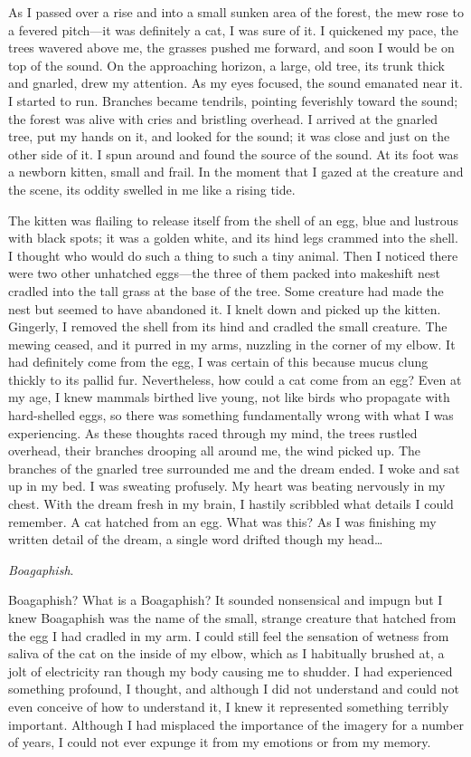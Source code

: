 As I passed over a rise and into a small sunken area of the forest, the
mew rose to a fevered pitch---it was definitely a cat, I was sure of it.
I quickened my pace, the trees wavered above me, the grasses pushed me
forward, and soon I would be on top of the sound. On the approaching
horizon, a large, old tree, its trunk thick and gnarled, drew my
attention. As my eyes focused, the sound emanated near it. I started to
run. Branches became tendrils, pointing feverishly toward the sound; the
forest was alive with cries and bristling overhead. I arrived at the
gnarled tree, put my hands on it, and looked for the sound; it was close
and just on the other side of it. I spun around and found the source of
the sound. At its foot was a newborn kitten, small and frail. In the
moment that I gazed at the creature and the scene, its oddity swelled in
me like a rising tide.

The kitten was flailing to release itself from the shell of an egg, blue
and lustrous with black spots; it was a golden white, and its hind legs
crammed into the shell. I thought who would do such a thing to such a
tiny animal. Then I noticed there were two other unhatched eggs---the
three of them packed into makeshift nest cradled into the tall grass at
the base of the tree. Some creature had made the nest but seemed to have
abandoned it. I knelt down and picked up the kitten. Gingerly, I removed
the shell from its hind and cradled the small creature. The mewing
ceased, and it purred in my arms, nuzzling in the corner of my elbow. It
had definitely come from the egg, I was certain of this because mucus
clung thickly to its pallid fur. Nevertheless, how could a cat come from
an egg? Even at my age, I knew mammals birthed live young, not like
birds who propagate with hard-shelled eggs, so there was something
fundamentally wrong with what I was experiencing. As these thoughts
raced through my mind, the trees rustled overhead, their branches
drooping all around me, the wind picked up. The branches of the gnarled
tree surrounded me and the dream ended. I woke and sat up in my bed. I
was sweating profusely. My heart was beating nervously in my chest. With
the dream fresh in my brain, I hastily scribbled what details I could
remember. A cat hatched from an egg. What was this? As I was finishing
my written detail of the dream, a single word drifted though my
head\ldots{}

\emph{Boagaphish}.

Boagaphish? What is a Boagaphish? It sounded nonsensical and impugn but
I knew Boagaphish was the name of the small, strange creature that
hatched from the egg I had cradled in my arm. I could still feel the
sensation of wetness from saliva of the cat on the inside of my elbow,
which as I habitually brushed at, a jolt of electricity ran though my
body causing me to shudder. I had experienced something profound, I
thought, and although I did not understand and could not even conceive
of how to understand it, I knew it represented something terribly
important. Although I had misplaced the importance of the imagery for a
number of years, I could not ever expunge it from my emotions or from my
memory.

